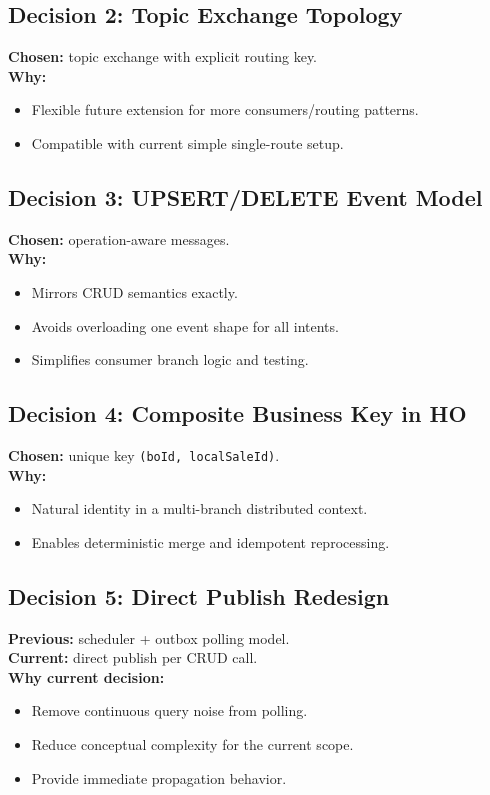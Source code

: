 \documentclass[11pt,a4paper]{article}
\begin{document}
\subsection{Decision 2: Topic Exchange Topology}
\textbf{Chosen:} topic exchange with explicit routing key.\\
\textbf{Why:}
\begin{itemize}[leftmargin=*]
  \item Flexible future extension for more consumers/routing patterns.
  \item Compatible with current simple single-route setup.
\end{itemize}

\subsection{Decision 3: UPSERT/DELETE Event Model}
\textbf{Chosen:} operation-aware messages.\\
\textbf{Why:}
\begin{itemize}[leftmargin=*]
  \item Mirrors CRUD semantics exactly.
  \item Avoids overloading one event shape for all intents.
  \item Simplifies consumer branch logic and testing.
\end{itemize}

\subsection{Decision 4: Composite Business Key in HO}
\textbf{Chosen:} unique key \texttt{(boId, localSaleId)}.\\
\textbf{Why:}
\begin{itemize}[leftmargin=*]
  \item Natural identity in a multi-branch distributed context.
  \item Enables deterministic merge and idempotent reprocessing.
\end{itemize}

\subsection{Decision 5: Direct Publish Redesign}
\textbf{Previous:} scheduler + outbox polling model.\\
\textbf{Current:} direct publish per CRUD call.\\
\textbf{Why current decision:}
\begin{itemize}[leftmargin=*]
  \item Remove continuous query noise from polling.
  \item Reduce conceptual complexity for the current scope.
  \item Provide immediate propagation behavior.
\end{itemize}
\end{document}
